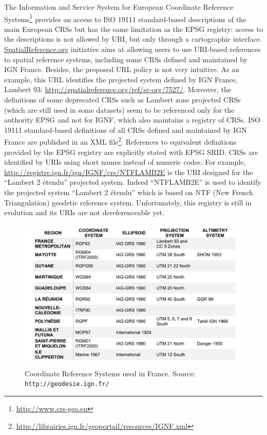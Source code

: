 The Information and Service System for European Coordinate Reference Systems\footnote{\url{http://www.crs-geo.eu}}  provides an access to ISO 19111 standard-based descriptions of the main European CRSs but has the same limitation as the EPSG registry: access to the descriptions is not allowed by URI, but only through a cartographic interface.
\url{SpatialReference.org} initiative aims at allowing users to use URI-based references to spatial reference systems, including some CRSs defined and maintained by IGN France.  Besides, the proposed URL policy is not very intuitive. As an example, this URL identifies the projected system defined by IGN France, Lambert 93: \url{http://spatialreference.org/ref/sr-org/7527/}. Moreover, the definitions of some deprecated CRSs such as Lambert zone projected CRSs (which are still used in some datasets) seem to be referenced only for the authority EPSG and not for IGNF, which also maintains a registry of CRSs. ISO 19111 standard-based definitions of all CRSs defined and maintained by IGN France are  published in an XML file\footnote{\url{ http://librairies.ign.fr/geoportail/resources/IGNF.xml}}.
References to equivalent definitions provided by the EPSG registry are explicitly stated with EPSG SRID. CRSs are identified by URIs using short names instead of numeric codes. For example, \url{http://registre.ign.fr/ign/IGNF/crs/NTFLAMB2E}  is the URI designed for the ``Lambert 2 \'{e}tendu'' projected system. Indeed ``NTFLAMB2E'' is used to identify the projected system ``Lambert 2 \'{e}tendu'' which is based on NTF (New French Triangulation) geodetic reference system. Unfortunately, this registry is still in evolution and its URIs are not dereferenceable yet.

\begin{figure}[!htbp]
 \begin{center}
  \includegraphics[width=120mm]{img/crs-france.png}
  \caption{Coordinate Reference Systems used in France. Source: \texttt{http://geodesie.ign.fr/}}
  \label{fig:crsinfr}
 \end{center}
\end{figure}
 
